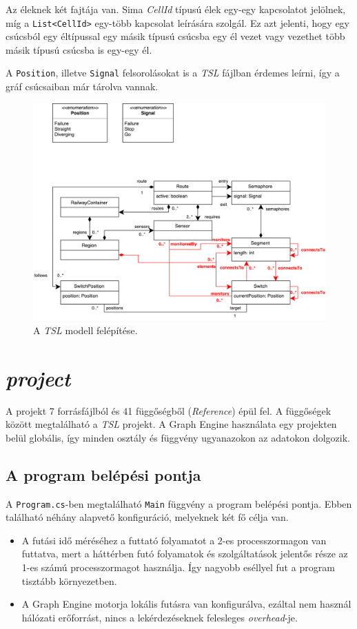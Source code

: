 Az éleknek két fajtája van. Sima \emph{CellId} típusú élek egy-egy kapcsolatot jelölnek, míg a \texttt{List<CellId>} egy-több kapcsolat leírására szolgál. Ez azt jelenti, hogy egy csúcsból egy éltípussal egy másik típusú csúcsba egy él vezet vagy vezethet több másik típusú csúcsba is egy-egy él.

A \texttt{Position}, illetve \texttt{Signal} felsorolásokat is a \emph{TSL} fájlban érdemes leírni, így a gráf csúcsaiban már tárolva vannak.

\begin{figure}[H]
	\centering
	\includegraphics[width=\linewidth, keepaspectratio]{figures/GraphEngineTSLModel.pdf}
	\caption{A \emph{TSL} modell felépítése.}
	\label{fig:GraphEngineTSLModel}
\end{figure}

\section{\emph{\Csh{} project}}

A projekt 7 forrásfájlból és 41 függőségből (\emph{Reference}) épül fel. A függőségek között megtalálható a \emph{TSL} projekt. A Graph Engine használata egy projekten belül globális, így minden osztály és függvény ugyanazokon az adatokon dolgozik.

\subsection{A program belépési pontja}

A \texttt{Program.cs}-ben megtalálható \texttt{Main} függvény a program belépési pontja. Ebben található néhány alapvető konfiguráció, melyeknek két fő célja van.
\begin{itemize}
	\item A futási idő méréséhez a futtató folyamatot a 2-es processzormagon van futtatva, mert a háttérben futó folyamatok és szolgáltatások jelentős része az 1-es számú processzormagot használja. Így nagyobb eséllyel fut a program tisztább környezetben.
	\item A Graph Engine motorja lokális futásra van konfigurálva, ezáltal nem használ hálózati erőforrást, nincs a lekérdezéseknek felesleges \emph{overhead}-je.
\end{itemize}


